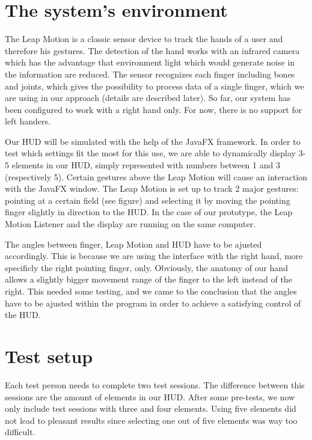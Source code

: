 \documentclass{sigchi-ext}
\begin{document}
\section{The system's environment}
The Leap Motion is a classic sensor device to track the hands of a user and therefore his gestures.
The detection of the hand works with an infrared camera which has the advantage that environment light
which would generate noise in the information are reduced. The sensor recognizes each finger including
bones and joints, which gives the possibility to process data of a single finger, which we are using in
our approach (details are described later). So far, our system has been configured to work with a right hand only.
For now, there is no support for left handers.\linebreak

Our HUD will be simulated with the help of the JavaFX framework. In order to test which settings fit the most for this use,
we are able to dynamically display 3-5 elements in our HUD, simply represented with numbers between 1 and 3 (respectively 5).
Certain gestures above the Leap Motion will cause an interaction with the JavaFX window.
The Leap Motion is set up to track 2 major gestures: pointing at a certain field (see figure)
and selecting it by moving the pointing finger slightly in direction to the HUD. In the case of our prototype,
the Leap Motion Listener and the display are running on the same computer.\linebreak

The angles between finger, Leap Motion and HUD have to be ajusted accordingly. This is because we are using the
interface with the right hand, more specificly the right pointing finger, only. Obviously, the anatomy of our hand
allows a slightly bigger movement range of the finger to the left instead of the right. This needed some testing, and we came to
the conclusion that the angles have to be ajusted within the program in order to achieve a satisfying control of the HUD.

\section{Test setup}
Each test person needs to complete two test sessions. The difference between this sessions are the amount of elements in our HUD. After some pre-tests, we now only include test sessions with three and four elements. Using five elements did not lead to pleasant results since selecting one out of five elements was way too difficult.  \linebreak
\end{document}
